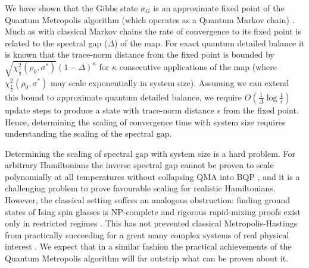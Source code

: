 \documentclass[aps,floatfix,10pt,amssymb,amsfont,amsmath,superscriptaddress,float,nofootinbib,longbibliography,nobalancelastpage,twocolumn]{revtex4-2}
\begin{document}
We have shown that the Gibbs state $\sigma_G$ is an approximate fixed point of the Quantum Metropolis algorithm (which operates as a Quantum Markov chain) . Much as with classical Markov chains the rate of convergence to its fixed point is related to the spectral gap ($\Delta$) of the map. For exact quantum detailed balance it is known \cite{temme2010chi} that the trace-norm distance from the fixed point is bounded by $\sqrt{\chi^2_{\frac{1}{2}}(\rho_0,\sigma^*)} (1-\Delta)^\kappa$ for $\kappa$ consecutive applications of the map (where $\chi^2_{\frac{1}{2}}(\rho_0,\sigma^*)$ may scale exponentially in system size). Assuming we can extend this bound to approximate quantum detailed balance, we require $O(\frac{1}{\Delta}\log \frac{1}{\epsilon})$ update steps to produce a state with trace-norm distance $\epsilon$ from the fixed point. Hence, determining the scaling of convergence time with system size requires understanding the scaling of the spectral gap.

Determining the scaling of spectral gap with system size is a hard problem. For arbitrary Hamiltonians the inverse spectral gap cannot be proven to scale polynomially at all temperatures without collapsing QMA into BQP \cite{oliveira2008complexityquantumspinsystems, Aharonov_2009, Schuch_2009}, and it is a challenging problem to prove favourable scaling for realistic Hamiltonians. However, the classical setting suffers an analogous obstruction: finding ground states of Ising spin glasses is NP-complete \cite{Barahona:1982zdv} and rigorous rapid-mixing proofs exist only in restricted regimes \cite{Martinelli1999}. This has not prevented classical Metropolis-Hastings from practically succeeding for a great many complex systems of real physical interest \cite{thijssen2007computational}. We expect that in a similar fashion the practical achievements of the Quantum Metropolis algorithm will far outstrip what can be proven about it. 
 
\end{document}
